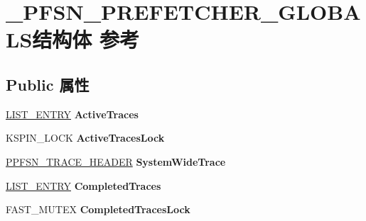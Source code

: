 \hypertarget{struct___p_f_s_n___p_r_e_f_e_t_c_h_e_r___g_l_o_b_a_l_s}{}\section{\+\_\+\+P\+F\+S\+N\+\_\+\+P\+R\+E\+F\+E\+T\+C\+H\+E\+R\+\_\+\+G\+L\+O\+B\+A\+L\+S结构体 参考}
\label{struct___p_f_s_n___p_r_e_f_e_t_c_h_e_r___g_l_o_b_a_l_s}
\subsection*{Public 属性}
\begin{DoxyCompactItemize}
\item 
\mbox{\label{struct___p_f_s_n___p_r_e_f_e_t_c_h_e_r___g_l_o_b_a_l_s_a14970ee64d902b1d9c02741856ecfd93}} 
\hyperlink{struct___l_i_s_t___e_n_t_r_y}{L\+I\+S\+T\+\_\+\+E\+N\+T\+RY} {\bfseries Active\+Traces}
\item 
\mbox{\label{struct___p_f_s_n___p_r_e_f_e_t_c_h_e_r___g_l_o_b_a_l_s_a8c66c7da9d3db0d9b130ee36025e3703}} 
K\+S\+P\+I\+N\+\_\+\+L\+O\+CK {\bfseries Active\+Traces\+Lock}
\item 
\mbox{\label{struct___p_f_s_n___p_r_e_f_e_t_c_h_e_r___g_l_o_b_a_l_s_a0e955bf3dbb3e8e259d1e36ae5a9a8ae}} 
\hyperlink{struct___p_f_s_n___t_r_a_c_e___h_e_a_d_e_r}{P\+P\+F\+S\+N\+\_\+\+T\+R\+A\+C\+E\+\_\+\+H\+E\+A\+D\+ER} {\bfseries System\+Wide\+Trace}
\item 
\mbox{\label{struct___p_f_s_n___p_r_e_f_e_t_c_h_e_r___g_l_o_b_a_l_s_a2da41efd21cb883c257d63b59b60de9d}} 
\hyperlink{struct___l_i_s_t___e_n_t_r_y}{L\+I\+S\+T\+\_\+\+E\+N\+T\+RY} {\bfseries Completed\+Traces}
\item 
\mbox{\label{struct___p_f_s_n___p_r_e_f_e_t_c_h_e_r___g_l_o_b_a_l_s_a5e0f26b6ccea0637c444929cdb079d37}} 
F\+A\+S\+T\+\_\+\+M\+U\+T\+EX {\bfseries Completed\+Traces\+Lock}
\item 

\end{DoxyCompactItemize}
